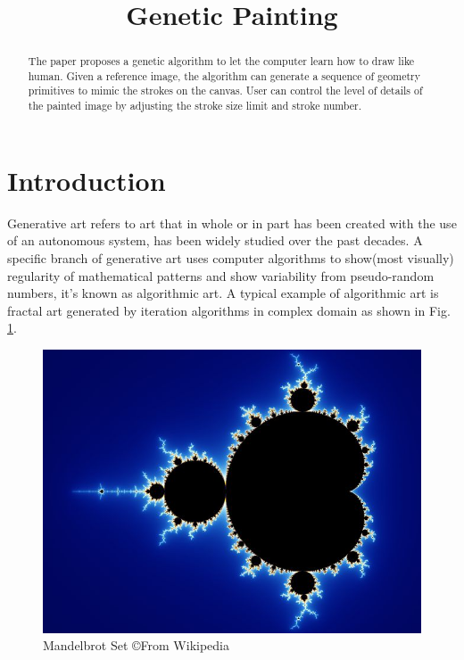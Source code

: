 \documentclass[a4paper,conference]{IEEEtran}
\begin{document}
\title{Genetic Painting}
\author{
  }
\maketitle



\begin{abstract}
  The paper proposes a genetic algorithm to let the computer learn how to draw like human. Given a reference image, the algorithm can generate a sequence of geometry primitives to mimic the strokes on the canvas. User can control the level of details of the painted image by adjusting the stroke size limit and stroke number. 
\end{abstract}
\section{Introduction}
Generative art refers to art that in whole or in part has been created with the use of an autonomous system, has been widely studied over the past decades. A specific branch of generative art uses computer algorithms to show(most visually) regularity of mathematical patterns and show variability from pseudo-random numbers, it's known as algorithmic art. A typical example of algorithmic art is fractal art generated by iteration algorithms in complex domain as shown in Fig. \ref{fig:fracal}.
\begin{figure}[htp]
  \centering
  \includegraphics[width=.8\columnwidth]{imgs/mandelbrot_set.jpg}
  \caption{Mandelbrot Set \copyright From Wikipedia}
  \label{fig:fracal}
\end{figure}
\end{document}
